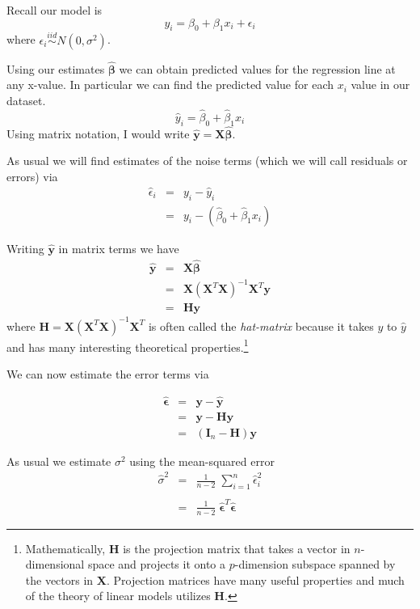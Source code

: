 \documentclass[]{book}
\let\rmarkdownfootnote\footnote%
\def\footnote{\protect\rmarkdownfootnote}
\theoremstyle{definition}
\theoremstyle{definition}
\theoremstyle{remark}
\begin{document}
Recall our model is \[
y_{i}=\beta_{0}+\beta_{1}x_{i}+\epsilon_{i}
\] where \(\epsilon_{i}\stackrel{iid}{\sim}N\left(0,\sigma^{2}\right)\).

Using our estimates \(\hat{\boldsymbol{\beta}}\) we can obtain predicted
values for the regression line at any x-value. In particular we can find
the predicted value for each \(x_i\) value in our dataset. \[
\hat{y}_i = \hat{\beta}_0 + \hat{\beta}_1 x_i
\] Using matrix notation, I would write
\(\hat{\boldsymbol{y}}=\boldsymbol{X}\hat{\boldsymbol{\beta}}\).

As usual we will find estimates of the noise terms (which we will call
residuals or errors) via \[\begin{eqnarray*}
\hat{\epsilon}_{i} & = & y_{i}-\hat{y}_{i}\\
 & = & y_{i}-\left(\hat{\beta}_{0}+\hat{\beta}_{1}x_{i}\right)
\end{eqnarray*}\]

Writing \(\hat{\boldsymbol{y}}\) in matrix terms we have
\[\begin{eqnarray*}
\hat{\boldsymbol{y}} & = & \boldsymbol{X}\hat{\boldsymbol{\beta}}\\
 & = & \boldsymbol{X}\left(\boldsymbol{X}^{T}\boldsymbol{X}\right)^{-1}\boldsymbol{X}^{T}\boldsymbol{y}\\
 & = & \boldsymbol{H}\boldsymbol{y}
\end{eqnarray*}\] where
\(\boldsymbol{H}=\boldsymbol{X}\left(\boldsymbol{X}^{T}\boldsymbol{X}\right)^{-1}\boldsymbol{X}^{T}\)
is often called the \emph{hat-matrix} because it takes \(y\) to
\(\hat{y}\) and has many interesting theoretical
properties.\footnote{Mathematically, $\boldsymbol{H}$ is the projection matrix that takes
a vector in $n$-dimensional space and projects it onto a $p$-dimension
subspace spanned by the vectors in $\boldsymbol{X}$. Projection matrices
have many useful properties and much of the theory of linear models
utilizes $\boldsymbol{H}$. }

We can now estimate the error terms via

\[\begin{eqnarray*}
\hat{\boldsymbol{\epsilon}} & = & \boldsymbol{y}-\hat{\boldsymbol{y}}\\
 & = & \boldsymbol{y}-\boldsymbol{H}\boldsymbol{y}\\
 & = & \left(\boldsymbol{I}_{n}-\boldsymbol{H}\right)\boldsymbol{y}
\end{eqnarray*}\]

As usual we estimate \(\sigma^{2}\) using the mean-squared error
\[\begin{eqnarray*}
\hat{\sigma}^{2} & = & \frac{1}{n-2}\;\sum_{i=1}^{n}\hat{\epsilon}_{i}^{2}\\
\\
 & = & \frac{1}{n-2}\;\hat{\boldsymbol{\epsilon}}^{T}\hat{\boldsymbol{\epsilon}}
\end{eqnarray*}\]
\end{document}
